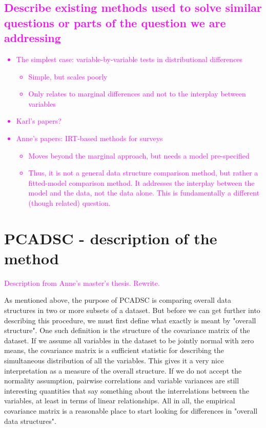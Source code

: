 \documentclass[titlepage,11pt,twoside]{article}
\newcommand{\hl}[1]{\textcolor{magenta}{#1}}
\begin{document}
\subsection{\hl{Describe existing methods used to solve similar questions or parts of the question we are addressing}}
\hl{
\begin{itemize}
\item The simplest case: variable-by-variable tests in distributional differences
	\begin{itemize}
		\item Simple, but scales poorly
		\item Only relates to marginal differences and not to the interplay between variables
	\end{itemize}
\item Karl's papers?
\item Anne's papers: IRT-based methods for surveys
	\begin{itemize}
		\item Moves beyond the marginal approach, but needs a model pre-specified
		\item Thus, it is not a general data structure comparison method, but rather a fitted-model comparison method. It addresses the interplay between the model and the data, not the data alone. This is fundamentally a different (though related) question.
	\end{itemize}
\end{itemize}
}


\section{PCADSC - description of the method}
\label{sec:pcadscintro}
\hl{Description from Anne's master's thesis. Rewrite.}

As mentioned above, the purpose of PCADSC is comparing overall data structures in two or more subsets of a dataset. But before we can get further into describing this procedure, we must first define what exactly is meant by "overall structure". One such definition is the structure of the covariance matrix of the dataset. If we assume all variables in the dataset to be jointly normal with zero means, the covariance matrix is a sufficient statistic for describing the simultaneous distribution of all the variables. This gives it a very nice interpretation as a measure of the overall structure. If we do not accept the normality assumption, pairwise correlations and variable variances are still interesting quantities that say something about the interrelations between the variables, at least in terms of linear relationships. All in all, the empirical covariance matrix is a reasonable place to start looking for differences in "overall data structures".
\end{document}
